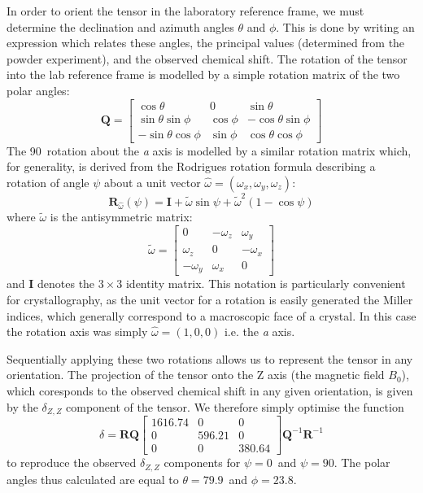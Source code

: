 \begin{refsection}
In order to orient the tensor in the laboratory reference frame, we must determine the declination and azimuth angles $\theta$ and $\phi$.
This is done by writing an expression which relates these angles, the principal values (determined from the powder experiment), and the observed chemical shift.
The rotation of the tensor into the lab reference frame is modelled by a simple rotation matrix of the two polar angles:
\begin{equation}
  \mathbf{Q} = \begin{bmatrix} \cos\theta & 0 & \sin\theta \\ \sin\theta\sin\phi  & \cos\phi & -\cos\theta\sin\phi \\ -\sin\theta\cos\phi & \sin\phi & \cos\theta\cos\phi \end{bmatrix}
\end{equation}
The 90\degree\ rotation about the \textit{a} axis is modelled by a similar rotation matrix which, for generality, is derived from the Rodrigues rotation formula describing a rotation of angle $\psi$ about a unit vector $\hat{\omega} = \left( \omega_{x}, \omega_{y}, \omega_{z} \right)$:
\begin{equation}
  \mathbf{R}_{\hat{\omega}}(\psi) = \mathbf{I} + \tilde{\omega}\sin\psi + \tilde{\omega}^{2}(1-\cos\psi)
\end{equation}
where $\tilde{\omega}$ is the antisymmetric matrix:
\begin{equation}
  \tilde{\omega} = \begin{bmatrix} 0 & -\omega_{z} & \omega_{y} \\ \omega_{z} & 0 & -\omega_{x} \\ -\omega_{y} & \omega_{x} & 0 \end{bmatrix}
\end{equation}
and $\mathbf{I}$ denotes the $3\times 3$ identity matrix.
This notation is particularly convenient for crystallography, as the unit vector for a rotation is easily generated the Miller indices, which generally correspond to a macroscopic face of a crystal.
In this case the rotation axis was simply $\hat{\omega} = (1,0,0)$ i.e. the \textit{a} axis.

Sequentially applying these two rotations allows us to represent the tensor in any orientation.
The projection of the tensor onto the Z axis (the magnetic field $B_{0}$), which coresponds to the observed chemical shift in any given orientation, is given by the $\delta_{Z,Z}$ component of the tensor.
We therefore simply optimise the function
\begin{equation}
  \delta = \mathbf{R} \mathbf{Q} \begin{bmatrix} 1616.74 & 0 & 0 \\ 0 & 596.21 & 0 \\ 0 & 0 & 380.64 \end{bmatrix} \mathbf{Q}^{-1} \mathbf{R}^{-1}
\end{equation}
to reproduce the observed $\delta_{Z,Z}$ components for $\psi = 0$\degree\ and $\psi = 90$\degree.
The polar angles thus calculated are equal to $\theta = 79.9$\degree\ and $\phi = 23.8$\degree.


\end{refsection}
